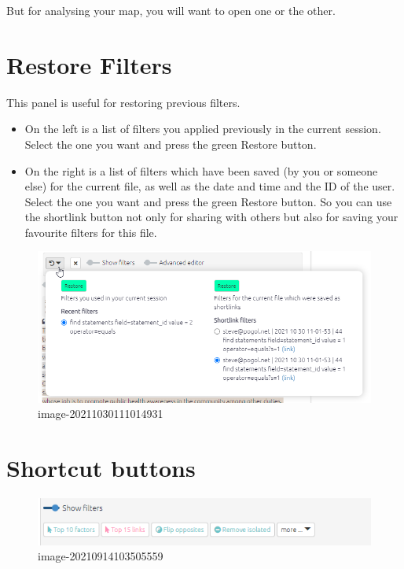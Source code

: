 \documentclass[
]{book}
\providecommand{\tightlist}{%
  \setlength{\itemsep}{0pt}\setlength{\parskip}{0pt}}
\begin{document}
But for analysing your map, you will want to open one or the other.

\hypertarget{restore-filters}{%
\section{Restore Filters}\label{restore-filters}}

This panel is useful for restoring previous filters.

\begin{itemize}
\tightlist
\item
  On the left is a list of filters you applied previously in the current session. Select the one you want and press the green Restore button.
\item
  On the right is a list of filters which have been saved (by you or someone else) for the current file, as well as the date and time and the ID of the user. Select the one you want and press the green Restore button. So you can use the shortlink button not only for sharing with others but also for saving your favourite filters for this file.
\end{itemize}

\begin{figure}
\centering
\includegraphics{_assets/image-20211030111014931.png}
\caption{image-20211030111014931}
\end{figure}

\hypertarget{shortcut-buttons-1}{%
\section{Shortcut buttons}\label{shortcut-buttons-1}}

\begin{figure}
\centering
\includegraphics[width=6.77083in,height=\textheight]{_assets/image-20210914103505559.png}
\caption{image-20210914103505559}
\end{figure}
\end{document}
